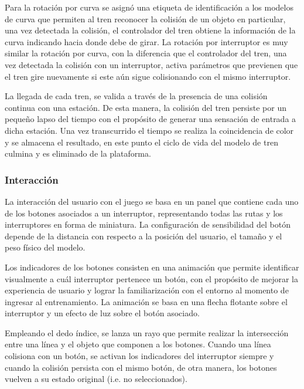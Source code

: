 \documentclass[conference]{IEEEtran}
\begin{document}
Para la rotación por curva se asignó una etiqueta de identificación a los modelos de curva que permiten al tren reconocer la colisión de un objeto en particular, una vez detectada la colisión, el controlador del tren obtiene la información de la curva indicando hacia donde debe de girar. La rotación por interruptor es muy similar la rotación por curva, con la diferencia que el controlador del tren, una vez detectada la colisión con un interruptor, activa parámetros que previenen que el tren gire nuevamente si este aún sigue colisionando con el mismo interruptor.

La llegada de cada tren, se valida a través de la presencia de una colisión continua con una estación. De esta manera, la colisión del tren persiste por un pequeño lapso del tiempo con el propósito de generar una sensación de entrada a dicha estación. Una vez transcurrido el tiempo se realiza la coincidencia de color y se almacena el resultado, en este punto el ciclo de vida del modelo de tren culmina y es eliminado de la plataforma.

\subsubsection*{Interacci\'on}

La interacción del usuario con el juego se basa en un panel que contiene cada uno de los botones asociados a un interruptor, representando todas las rutas y los interruptores en forma de miniatura. La configuración de sensibilidad del botón depende de la distancia con respecto a la posición del usuario, el tamaño y el peso físico del modelo.

Los indicadores de los botones consisten en una animación que permite identificar visualmente a cuál interruptor pertenece un botón, con el propósito de mejorar la experiencia de usuario y lograr la familiarización con el entorno al momento de ingresar al entrenamiento. La animación se basa en una flecha flotante sobre el interruptor y un efecto de luz sobre el botón asociado. 

Empleando el dedo índice, se lanza un rayo que permite realizar la intersección entre una línea y el objeto que componen a los botones. Cuando una línea colisiona con un botón, se activan los indicadores del interruptor siempre y cuando la colisión persista con el mismo botón, de otra manera, los botones vuelven a su estado original (i.e. no seleccionados).


\end{document}
